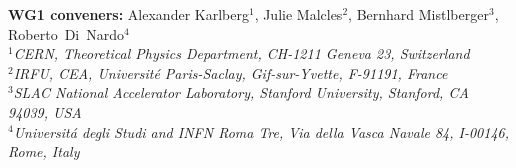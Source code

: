 \documentclass[11pt]{report}
\begin{document}
\begin{center}
	\textrm{
    {\large {\bf WG1 conveners:} Alexander Karlberg$^{1}$,
     Julie Malcles$^{2}$,
     Bernhard Mistlberger$^{3}$,
     Roberto~Di~Nardo$^{4}$ 
    }} \\[0.3cm]	
    \textit{$^{1}$CERN, Theoretical Physics Department, CH-1211 Geneva 23, Switzerland } \\
    \textit{$^{2}$IRFU, CEA, Universit\'e Paris-Saclay, Gif-sur-Yvette, F-91191, France} \\
    \textit{$^{3}$SLAC National Accelerator Laboratory, Stanford University, Stanford, CA 94039, USA } \\
    \textit{$^{4}$Universit\'{a} degli Studi and INFN Roma Tre, Via della Vasca Navale 84, I-00146, Rome, Italy}\\

\end{center}
\end{document}
